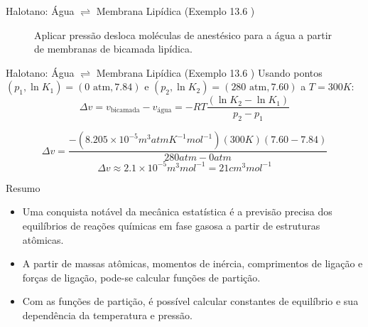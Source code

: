 \documentclass{beamer}
\begin{document}
\begin{frame}{Halotano: Água $\rightleftharpoons$ Membrana Lipídica (Exemplo 13.6 )}
        \begin{figure}
        \centering
        \caption{Aplicar pressão desloca moléculas de anestésico para a água a partir de membranas de bicamada lipídica.}
        \end{figure}
        
\end{frame}

\begin{frame}{Halotano: Água $\rightleftharpoons$ Membrana Lipídica (Exemplo 13.6 )}
        Usando pontos $(p_1, \ln K_1) = (0 \text{ atm}, 7.84)$ e $(p_2, \ln K_2) = (280 \text{ atm}, 7.60)$ a $T=300K$:
        $$ \Delta v = v_{\text{bicamada}} - v_{\text{água}} = -RT \frac{(\ln K_2 - \ln K_1)}{p_2 - p_1} $$
        
        $$ \Delta v = \frac{-(8.205 \times 10^{-5} m^3 atm K^{-1} mol^{-1})(300K)(7.60 - 7.84)}{280 atm - 0 atm} $$
        $$ \Delta v \approx 2.1 \times 10^{-5} m^3 mol^{-1} = 21 cm^3 mol^{-1} $$
        
\end{frame}


\begin{frame}{Resumo}
    \begin{itemize}
        \item Uma conquista notável da mecânica estatística é a previsão precisa dos equilíbrios de reações químicas em fase gasosa a partir de estruturas atômicas.
        \item A partir de massas atômicas, momentos de inércia, comprimentos de ligação e forças de ligação, pode-se calcular funções de partição.
        \item Com as funções de partição, é possível calcular constantes de equilíbrio e sua dependência da temperatura e pressão.
    \end{itemize}
\end{frame}

\end{document}
